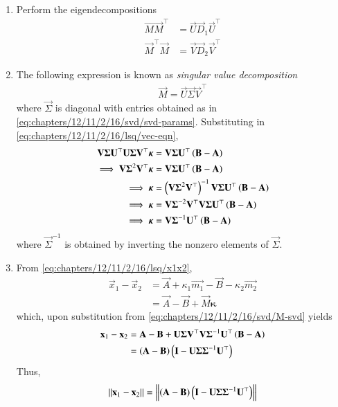 \begin{enumerate}[label=\thesubsection.\arabic*.,ref=\thesubsection.\theenumi]
	\item Perform the eigendecompositions 
    \begin{align}
	    \vec{MM}^\top &= \vec{U}\vec{D}_1\vec{U}^\top \label{eq:chapters/12/11/2/16/svd/decomp-1} \\
	    \vec{M}^\top\vec{M} &= \vec{V}\vec{D}_2\vec{V}^\top \label{eq:chapters/12/11/2/16/svd/decomp-2}
    \end{align}
	\item    The following expression is known as {\em singular value decomposition}
    \begin{align}
        \vec{M} = 
	\vec{U}\vec{\Sigma}\vec{V}^\top
        \label{eq:chapters/12/11/2/16/svd/M-svd}
    \end{align}
    where $\vec{\Sigma}$ is diagonal with
    entries obtained as in 
        \eqref{eq:chapters/12/11/2/16/svd/svd-params}.
 Substituting in 
        \eqref{eq:chapters/12/11/2/16/lsq/vec-eqn},
	\begin{align}
\mathbf{V}\mathbf{\Sigma}\mathbf{U}^\top\mathbf{U}\mathbf{\Sigma}\mathbf{V}^\top\bm{\kappa} &= \mathbf{V}\mathbf{\Sigma}\mathbf{U}^\top\left(\mathbf{B}-\mathbf{A}\right) \\
\implies \mathbf{V}\mathbf{\Sigma}^2\mathbf{V}^\top\bm{\kappa} &= \mathbf{V}\mathbf{\Sigma}\mathbf{U}^\top\left(\mathbf{B}-\mathbf{A}\right) \\
\implies \bm{\kappa} &= \left(\mathbf{V}\mathbf{\Sigma}^2\mathbf{V}^\top\right)^{-1}\mathbf{V}\mathbf{\Sigma}\mathbf{U}^\top\left(\mathbf{B}-\mathbf{A}\right) \\
\implies \bm{\kappa} &= \mathbf{V}\mathbf{\Sigma}^{-2}\mathbf{V}^\top\mathbf{V}\mathbf{\Sigma}\mathbf{U}^\top\left(\mathbf{B}-\mathbf{A}\right) \\
\implies \bm{\kappa} &= \mathbf{V}\mathbf{\Sigma}^{-1}\mathbf{U}^\top\left(\mathbf{B}-\mathbf{A}\right)
\label{eq:chapters/12/11/2/16/svd/kappa-sol}
\end{align}
    where $\vec{\Sigma}^{-1}$ is obtained by inverting the nonzero elements of
    $\vec{\Sigma}$. 
		\item 
	    From \eqref{eq:chapters/12/11/2/16/lsq/x1x2}, 
\begin{align}
	\vec{x}_1-\vec{x}_2 &= 
	\vec{A}+ \kappa_1\vec{m_1}
	 -\vec{B}  - \kappa_2\vec{m_2} 
	 \\
	 &=
	\vec{A} 
	 -\vec{B}  + \vec{M} 
	\bm{\kappa}
\end{align}
which, upon substitution from 
        \eqref{eq:chapters/12/11/2/16/svd/M-svd}
	yields
\begin{align}
	\mathbf{x}_1-\mathbf{x}_2 &= 
	\mathbf{A} 
	 -\mathbf{B}  + 
\mathbf{U}\mathbf{\Sigma}\mathbf{V}^\top
\mathbf{V}\mathbf{\Sigma}^{-1}\mathbf{U}^\top\left(\mathbf{B}-\mathbf{A}\right)
\\
	&=
	\left(	\mathbf{A} 
	 -\mathbf{B}\right)  \left(\mathbf{I}- 
\mathbf{U}\mathbf{\Sigma}
	\mathbf{\Sigma}^{-1}\mathbf{U}^\top\right)
\end{align}
			Thus, 
    \begin{align}
	    \left\lVert\mathbf{x}_1-\mathbf{x}_2\right\rVert = 
	\left\lVert\left(	\mathbf{A} 
	 -\mathbf{B}\right)  \left(\mathbf{I}- 
\mathbf{U}\mathbf{\Sigma}
	    \mathbf{\Sigma}^{-1}\mathbf{U}^\top\right)\right\rVert
        \label{eq:chapters/12/11/2/16/svd/min-sol}
    \end{align}
\end{enumerate}
